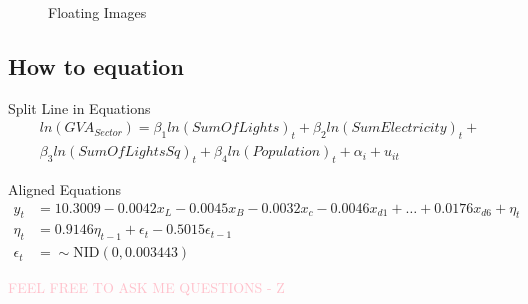\begin{figure}[!ht]
	\centering
	\caption{Floating Images}%
	\label{fig:floatimage}%
\end{figure}


\subsection*{How to equation}

Split Line in Equations
\begin{equation}
\begin{split}
\label{eqn:natsec}
ln(GVA_{Sector}) = \beta_1ln(SumOfLights)_{t}+\beta_2ln(SumElectricity)_t +\\ \beta_3ln(SumOfLightsSq)_{t} + \beta_4ln(Population)_{t} +
\alpha_i + u_{it}
\end{split}
\end{equation}

Aligned Equations
$$
\begin{aligned}
y_t &= 10.3009 -0.0042x_L - 0.0045x_B - 0.0032x_c -0.0046x_{d1} + \ldots + 0.0176x_{d6} + \eta_t \\
\eta_t &= 0.9146\eta_{t-1} + \epsilon_t -0.5015\epsilon_{t-1}\\
\epsilon_t &= \sim \text{NID}(0,0.003443)
\end{aligned}
$$

{\Huge \textcolor{pink}{FEEL FREE TO ASK ME QUESTIONS - Z}}


